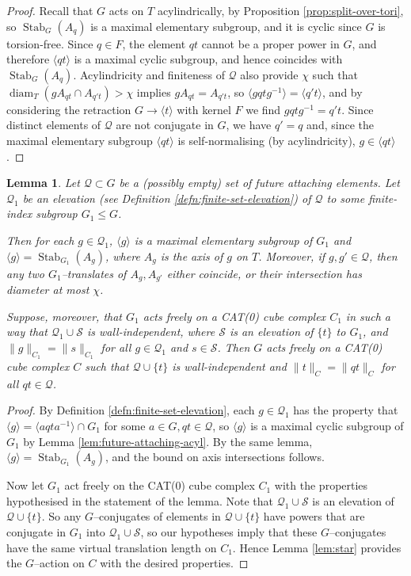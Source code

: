 \documentclass[11pt,oneside]{amsart}
\newcounter{ax}
\newtheorem{lem}[thm]{Lemma}
\theoremstyle{definition}
\DeclareMathOperator{\stabilizer}{Stab}
\DeclareMathOperator{\diam}{diam}
\begin{document}
\begin{proof}
Recall that $G$ acts on $T$ acylindrically, by Proposition \ref{prop:split-over-tori}, so $\stabilizer_G(A_q)$ is a maximal elementary subgroup, and it is cyclic since $G$ is torsion-free.  Since $q\in F$, the element $qt$ cannot be a proper power in $G$, and therefore $\langle qt\rangle$ is a maximal cyclic subgroup, and hence coincides with $\stabilizer_G(A_q)$.  Acylindricity and finiteness of $\mathcal Q$ also provide $\chi$ such that $\diam_T(gA_{qt}\cap A_{q't})>\chi$ implies $gA_{qt}=A_{q't}$, so $\langle gqtg^{-1}\rangle=\langle q't\rangle$, and by considering the retraction $G\to\langle t\rangle$ with kernel $F$ we find $gqtg^{-1}=q't$.  Since distinct elements of $\mathcal Q$ are not conjugate in $G$, we have $q'=q$ and, since the maximal elementary subgroup $\langle qt\rangle$ is self-normalising (by acylindricity), $g\in\langle qt\rangle$.
\end{proof}

\begin{lem}\label{lem:cubulate-linear-finite-index}
Let $\mathcal Q\subset G$ be a (possibly empty) set of future attaching elements.  Let $\mathcal Q_1$ be an elevation (see Definition \ref{defn:finite-set-elevation}) of $\mathcal Q$ to some finite-index subgroup $G_1\leq G$.

Then for each $g\in \mathcal Q_1$, $\langle g\rangle$ is a maximal elementary subgroup of $G_1$ and $\langle g\rangle=\stabilizer_{G_1}(A_g)$, where $A_g$ is the axis of $g$ on $T$.  Moreover, if $g,g'\in \mathcal Q$, then any two $G_1$--translates of $A_g,A_{g'}$ either coincide, or their intersection has diameter at most $\chi$.

Suppose, moreover, that $G_1$ acts freely on a CAT(0) cube complex $C_1$ in such a way that $\mathcal Q_1\cup \mathcal S$ is wall-independent, where $\mathcal S$ is an elevation of $\{t\}$ to $G_1$, and $\|g\|_{C_1}=\|s\|_{C_1}$ for all $g\in\mathcal Q_1$ and $s\in\mathcal S$.  Then $G$ acts freely on a CAT(0) cube complex $C$ such that $\mathcal Q\cup\{t\}$ is wall-independent and $\|t\|_C=\|qt\|_C$ for all $qt\in\mathcal Q$.
\end{lem}

\begin{proof}
By Definition \ref{defn:finite-set-elevation}, each $g\in\mathcal Q_1$ has the property that $\langle g\rangle = \langle aqta^{-1}\rangle \cap G_1$ for some $a\in G,qt\in\mathcal Q$, so $\langle g\rangle$ is a maximal cyclic subgroup of $G_1$ by Lemma \ref{lem:future-attaching-acyl}.  By the same lemma, $\langle g\rangle=\stabilizer_{G_1}(A_g)$, and the bound on axis intersections follows.  

Now let $G_1$ act freely on the CAT(0) cube complex $C_1$ with the properties hypothesised in the statement of the lemma.  Note that $\mathcal Q_1\cup\mathcal S$ is an elevation of $\mathcal Q\cup\{t\}$.  So any $G$--conjugates of elements in $\mathcal Q\cup \{t\}$ have powers that are conjugate in $G_1$ into $\mathcal Q_1\cup\mathcal S$, so our hypotheses imply that these $G$--conjugates have the same virtual translation length on $C_1$.  Hence Lemma \ref{lem:star} provides the $G$--action on $C$ with the desired properties.
\end{proof}
\end{document}
